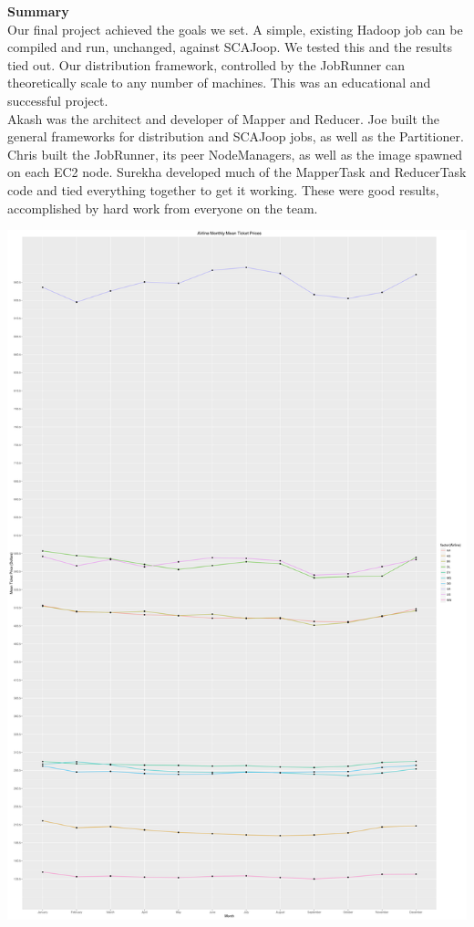 \documentclass{article}
\begin{document}
\textbf{Summary} \\
Our final project achieved the goals we set. A simple, existing Hadoop job can be compiled and run, unchanged, against SCAJoop. We tested this and the results tied out. Our distribution framework, controlled by the JobRunner can theoretically scale to any number of machines. This was an educational and successful project.\\
Akash was the architect and developer of Mapper and Reducer. Joe built the general frameworks for distribution and SCAJoop jobs, as well as the Partitioner. Chris built the JobRunner, its peer NodeManagers, as well as the image spawned on each EC2 node. Surekha developed much of the MapperTask and ReducerTask code and tied everything together to get it working. These were good results, accomplished by hard work from everyone on the team. 

\bigskip
\includegraphics[height=20cm,width=16.25cm]{plot.png}
\end{document}
